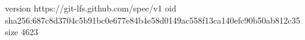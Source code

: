 version https://git-lfs.github.com/spec/v1
oid sha256:687c8d3704c5b91bc0e677e84b4e58d0149ac558f13ca140efc90b50ab812c35
size 4623
